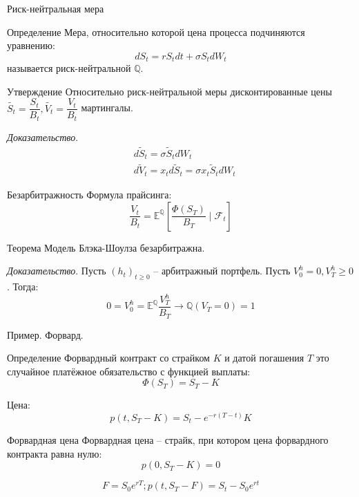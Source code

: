 \documentclass{beamer}
\begin{document}
\begin{frame}{Риск-нейтральная мера}
    \begin{block}{Определение}
        Мера, относительно которой цена процесса подчиняются уравнению:
        $$
            dS_t = r S_t dt + \sigma S_t dW_t
        $$ называется риск-нейтральной $\mathbb{Q}$.
    \end{block}
    \begin{block}{Утверждение}
        Относительно риск-нейтральной меры дисконтированные цены $\widetilde{S_t} = \dfrac{S_t}{B_t}, \widetilde{V_t} = \dfrac{V_t}{B_t}$ мартингалы.
    \end{block}
    \textit{Доказательство}. 
    \begin{align*}
        &d \widetilde S_t = \sigma \widetilde S_t dW_t \\
        &d \widetilde V_t = x_t d \widetilde S_t = \sigma x_t \widetilde S_t dW_t 
    \end{align*}
    
\end{frame}

\begin{frame}{Безарбитражность}
    Формула прайсинга:
    $$
        \dfrac{V_t}{B_t} = \mathbb{E}^{\mathbb{Q}}
        \left[ \dfrac{\Phi(S_T)}{B_T} \mid \mathcal{F}_t\right]
    $$

    \pause 

    \begin{block}{Теорема}
        Модель Блэка-Шоулза безарбитражна. 
    \end{block}
    \textit{Доказательство}. Пусть $(h_t)_{t\geq 0}$ -- арбитражный портфель. Пусть $V_0^h = 0, V_T^h \geq 0$. Тогда:
    $$
        0 = V_0^h = \mathbb{E}^{\mathbb{Q}} \dfrac{V_T^h}{B_T} \to \mathbb{Q}(V_T = 0) = 1
    $$
\end{frame}

\begin{frame}{Пример. Форвард.}
    \begin{block}{Определение}
        Форвардный контракт со страйком $K$ и датой погашения $T$ это случайное платёжное обязательство с функцией выплаты:
        $$
            \Phi(S_T) = S_T - K
        $$
    \end{block}
    
    \pause

    Цена:
    $$
        p(t, S_T - K) = S_t - e^{-r(T-t)} K
    $$

    \pause

    \begin{block}{Форвардная цена}
        Форвардная цена -- страйк, при котором цена форвардного контракта равна нулю:
        $$
            p(0, S_T - K) = 0
        $$
    \end{block}
    $$F = S_0 e^{rT}; p(t, S_T - F) = S_t - S_0 e^{rt}$$    
\end{frame}
\end{document}
